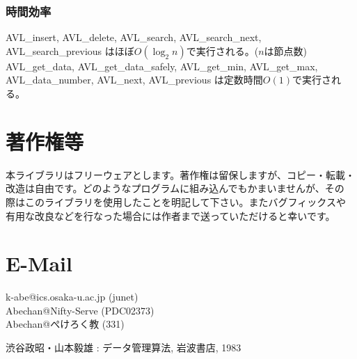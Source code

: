 \subsubsection{時間効率}
\begin{sloppypar}
AVL\_insert, AVL\_delete, AVL\_search, AVL\_search\_next,
AVL\_search\_previous はほぼ$O(\log_2{n})$で実行される。($n$は節点数)
AVL\_get\_data, AVL\_get\_data\_safely, AVL\_get\_min, AVL\_get\_max,
AVL\_data\_number, AVL\_next, AVL\_previous は定数時間$O(1)$で実行され
る。
\end{sloppypar}

\section{著作権等}
本ライブラリはフリーウェアとします。著作権は留保しますが、コピー・転載・
改造は自由です。どのようなプログラムに組み込んでもかまいませんが、その
際はこのライブラリを使用したことを明記して下さい。またバグフィックスや
有用な改良などを行なった場合には作者まで送っていただけると幸いです。

\section{E-Mail}
\noindent
k-abe@ics.osaka-u.ac.jp (junet)\\
Abechan@Nifty-Serve (PDC02373)\\
Abechan@ぺけろく教 (331)

\begin{thebibliography}{99}
 渋谷政昭・山本毅雄 : データ管理算法, 岩波書店, 1983
\end{thebibliography}

